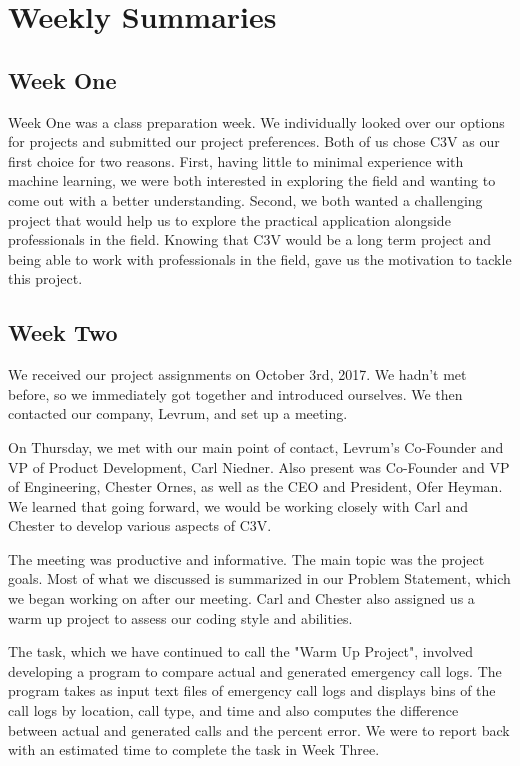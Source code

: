 \documentclass[onecolumn, draftclsnofoot,10pt, compsoc]{IEEEtran}
\begin{document}
\section{Weekly Summaries} \label{weekly_summ}
\begin{singlespace}
\subsection{Week One}
Week One was a class preparation week. We individually looked over our options for projects and submitted our project preferences. 
Both of us chose C3V as our first choice for two reasons. 
First, having little to minimal experience with machine learning, we were both interested in exploring the field and wanting to come out with a better understanding.
Second, we both wanted a challenging project that would help us to explore the practical application alongside professionals in the field. 
Knowing that C3V would be a long term project and being able to work with professionals in the field, gave us the motivation to tackle this project.

\subsection{Week Two}
We received our project assignments on October 3rd, 2017.
We hadn't met before, so we immediately got together and introduced ourselves. 
We then contacted our company, Levrum, and set up a meeting.

On Thursday, we met with our main point of contact, Levrum's Co-Founder and VP of Product Development, Carl Niedner. 
Also present was Co-Founder and VP of Engineering, Chester Ornes, as well as the CEO and President, Ofer Heyman. 
We learned that going forward, we would be working closely with Carl and Chester to develop various aspects of C3V.

The meeting was productive and informative. 
The main topic was the project goals. 
Most of what we discussed is summarized in our Problem Statement, which we began working on after our meeting. 
Carl and Chester also assigned us a warm up project to assess our coding style and abilities.

The task, which we have continued to call the "Warm Up Project", involved developing a program to compare actual and generated emergency call logs. 
The program takes as input text files of emergency call logs and displays bins of the call logs by location, call type, and time and also computes the difference between actual and generated calls and the percent error. 
We were to report back with an estimated time to complete the task in Week Three.


\end{singlespace}
\end{document}
